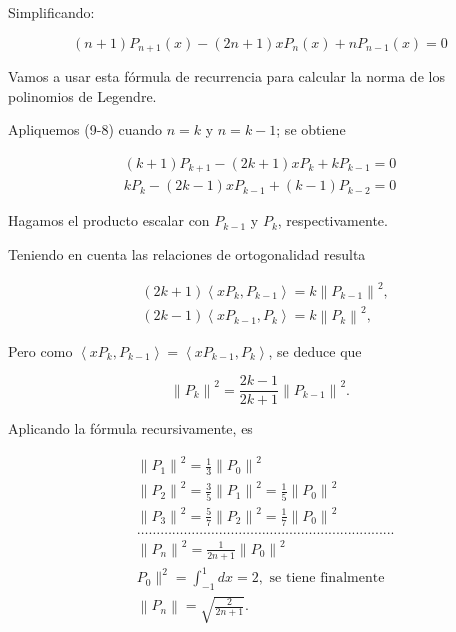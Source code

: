 \documentclass[10pt]{article}
\theoremstyle{plain}
\theoremstyle{definition}
\theoremstyle{remark}
\begin{document}
Simplificando:


\begin{equation*}
(n+1) P_{n+1}(x)-(2 n+1) x P_{n}(x)+n P_{n-1}(x)=0 \tag{9-8}
\end{equation*}


Vamos a usar esta fórmula de recurrencia para calcular la norma de los polinomios de Legendre.

Apliquemos (9-8) cuando $n=k$ y $n=k-1$; se obtiene

$$
\begin{gathered}
(k+1) P_{k+1}-(2 k+1) x P_{k}+k P_{k-1}=0 \\
k P_{k}-(2 k-1) x P_{k-1}+(k-1) P_{k-2}=0
\end{gathered}
$$

Hagamos el producto escalar con $P_{k-1}$ y $P_{k}$, respectivamente.

Teniendo en cuenta las relaciones de ortogonalidad resulta

$$
\begin{aligned}
& (2 k+1)\left\langle x P_{k}, P_{k-1}\right\rangle=k\left\|P_{k-1}\right\|^{2}, \\
& (2 k-1)\left\langle x P_{k-1}, P_{k}\right\rangle=k\left\|P_{k}\right\|^{2},
\end{aligned}
$$

Pero como $\left\langle x P_{k}, P_{k-1}\right\rangle=\left\langle x P_{k-1}, P_{k}\right\rangle$, se deduce que

$$
\left\|P_{k}\right\|^{2}=\frac{2 k-1}{2 k+1}\left\|P_{k-1}\right\|^{2} .
$$

Aplicando la fórmula recursivamente, es


\begin{align*}
& \left\|P_{1}\right\|^{2}=\frac{1}{3}\left\|P_{0}\right\|^{2} \\
& \left\|P_{2}\right\|^{2}=\frac{3}{5}\left\|P_{1}\right\|^{2}=\frac{1}{5}\left\|P_{0}\right\|^{2} \\
& \left\|P_{3}\right\|^{2}=\frac{5}{7}\left\|P_{2}\right\|^{2}=\frac{1}{7}\left\|P_{0}\right\|^{2} \\
& \ldots \ldots \ldots \ldots \ldots \ldots \ldots \ldots \ldots \ldots \ldots \ldots \ldots \ldots \ldots . . . . . . . . . . . . . . . . . . . . . \\
& \left\|P_{n}\right\|^{2}=\frac{1}{2 n+1}\left\|P_{0}\right\|^{2} \\
& P_{0} \|^{2}=\int_{-1}^{1} d x=2, \text { se tiene finalmente } \\
& \left\|P_{n}\right\|=\sqrt{\frac{2}{2 n+1}} . \tag{9-9}
\end{align*}
\end{document}
